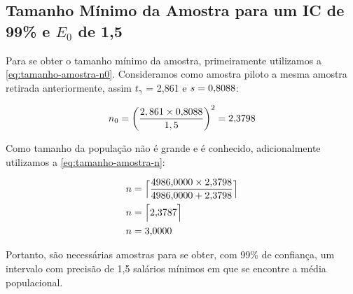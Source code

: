 \subsection{Tamanho Mínimo da Amostra para um IC de 99\% e $E_0$ de 1,5}

	Para se obter o tamanho mínimo da amostra, primeiramente utilizamos a
	\autoref{eq:tamanho-amostra-n0}. Consideramos como amostra piloto a mesma
	amostra retirada anteriormente, assim $t_{\gamma}$ = 2,861 e $s = \num{0.8088}$:

	\begin{align*}
		n_0 = \left (\frac{2,861 \times \num{0.8088}}{1,5} \right)^2 = \num{2.3798}
	\end{align*}

	Como tamanho da população não é grande e é conhecido, adicionalmente
	utilizamos a \autoref{eq:tamanho-amostra-n}:

	\begin{align*}
			n &= \Big\lceil \frac{\num{4986} \times \num{2.3798}}{\num{4986} + \num{2.3798}} \Big\rceil \\
			n &= \Big\lceil \num{2.3787} \Big\rceil \\
			n &= \num{3}
	\end{align*}

Portanto, são necessárias \TRESnZeroCorrigidoRounded amostras para se obter, com 99\% de confiança,
um intervalo com precisão de 1,5 salários mínimos em que se encontre a média populacional.
